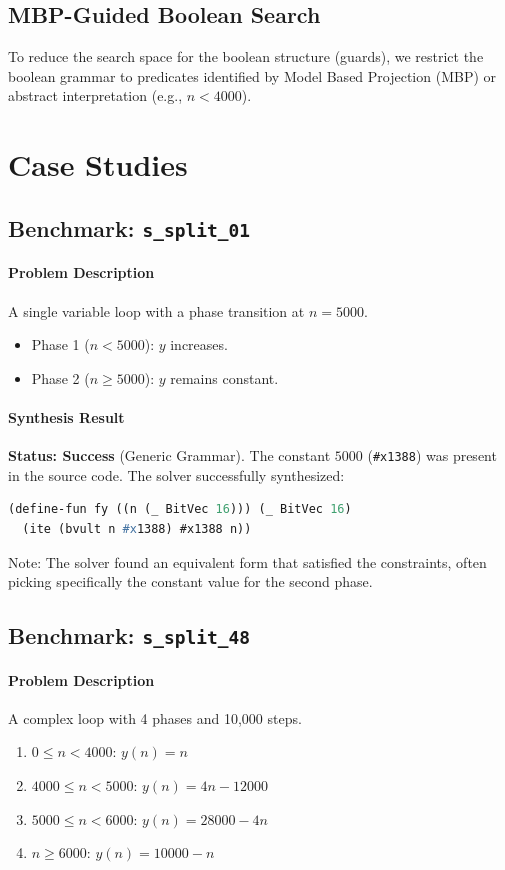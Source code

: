 \documentclass{article}
\begin{document}
\subsection{MBP-Guided Boolean Search}
To reduce the search space for the boolean structure (guards), we restrict the boolean grammar to predicates identified by Model Based Projection (MBP) or abstract interpretation (e.g., $n < 4000$).

\section{Case Studies}

\subsection{Benchmark: \texttt{s\_split\_01}}
\paragraph{Problem Description}
A single variable loop with a phase transition at $n=5000$.
\begin{itemize}
    \item Phase 1 ($n < 5000$): $y$ increases.
    \item Phase 2 ($n \ge 5000$): $y$ remains constant.
\end{itemize}

\paragraph{Synthesis Result}
\textbf{Status: Success} (Generic Grammar).
The constant $5000$ (\texttt{\#x1388}) was present in the source code. The solver successfully synthesized:
\begin{lstlisting}[language=Lisp]
(define-fun fy ((n (_ BitVec 16))) (_ BitVec 16) 
  (ite (bvult n #x1388) #x1388 n))
\end{lstlisting}
Note: The solver found an equivalent form that satisfied the constraints, often picking specifically the constant value for the second phase.

\subsection{Benchmark: \texttt{s\_split\_48}}
\paragraph{Problem Description}
A complex loop with 4 phases and 10,000 steps.
\begin{enumerate}
    \item $0 \le n < 4000$: $y(n) = n$
    \item $4000 \le n < 5000$: $y(n) = 4n - 12000$
    \item $5000 \le n < 6000$: $y(n) = 28000 - 4n$
    \item $n \ge 6000$: $y(n) = 10000 - n$
\end{enumerate}
\end{document}

